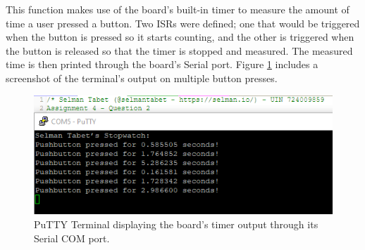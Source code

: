 \documentclass{article}
\begin{document}
This function makes use of the board's built-in timer to measure the amount of time a user pressed a button. Two ISRs were defined; one that would be triggered when the button is pressed so it starts counting, and the other is triggered when the button is released so that the timer is stopped and measured. The measured time is then printed through the board's Serial port. Figure \ref{fig:q2} includes a screenshot of the terminal's output on multiple button presses.


\begin{figure}[!ht]
\begin{center}
\includegraphics{Figures/Q2.png}
\end{center}
\caption {PuTTY Terminal displaying the board's timer output through its Serial COM port.}
\label{fig:q2}
\end{figure}

\pagebreak
\end{document}
